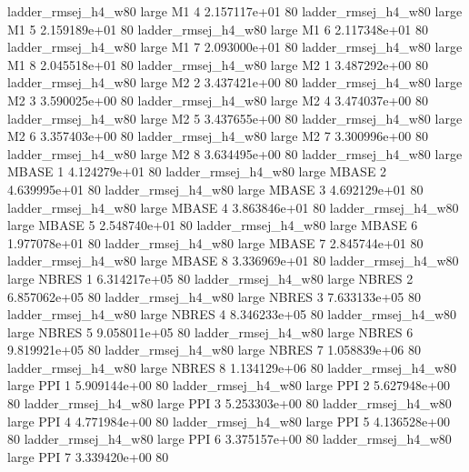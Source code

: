 ladder_rmsej_h4_w80      large       M1                 4 2.157117e+01 80
ladder_rmsej_h4_w80      large       M1                 5 2.159189e+01 80
ladder_rmsej_h4_w80      large       M1                 6 2.117348e+01 80
ladder_rmsej_h4_w80      large       M1                 7 2.093000e+01 80
ladder_rmsej_h4_w80      large       M1                 8 2.045518e+01 80
ladder_rmsej_h4_w80      large       M2                 1 3.487292e+00 80
ladder_rmsej_h4_w80      large       M2                 2 3.437421e+00 80
ladder_rmsej_h4_w80      large       M2                 3 3.590025e+00 80
ladder_rmsej_h4_w80      large       M2                 4 3.474037e+00 80
ladder_rmsej_h4_w80      large       M2                 5 3.437655e+00 80
ladder_rmsej_h4_w80      large       M2                 6 3.357403e+00 80
ladder_rmsej_h4_w80      large       M2                 7 3.300996e+00 80
ladder_rmsej_h4_w80      large       M2                 8 3.634495e+00 80
ladder_rmsej_h4_w80      large    MBASE                 1 4.124279e+01 80
ladder_rmsej_h4_w80      large    MBASE                 2 4.639995e+01 80
ladder_rmsej_h4_w80      large    MBASE                 3 4.692129e+01 80
ladder_rmsej_h4_w80      large    MBASE                 4 3.863846e+01 80
ladder_rmsej_h4_w80      large    MBASE                 5 2.548740e+01 80
ladder_rmsej_h4_w80      large    MBASE                 6 1.977078e+01 80
ladder_rmsej_h4_w80      large    MBASE                 7 2.845744e+01 80
ladder_rmsej_h4_w80      large    MBASE                 8 3.336969e+01 80
ladder_rmsej_h4_w80      large    NBRES                 1 6.314217e+05 80
ladder_rmsej_h4_w80      large    NBRES                 2 6.857062e+05 80
ladder_rmsej_h4_w80      large    NBRES                 3 7.633133e+05 80
ladder_rmsej_h4_w80      large    NBRES                 4 8.346233e+05 80
ladder_rmsej_h4_w80      large    NBRES                 5 9.058011e+05 80
ladder_rmsej_h4_w80      large    NBRES                 6 9.819921e+05 80
ladder_rmsej_h4_w80      large    NBRES                 7 1.058839e+06 80
ladder_rmsej_h4_w80      large    NBRES                 8 1.134129e+06 80
ladder_rmsej_h4_w80      large      PPI                 1 5.909144e+00 80
ladder_rmsej_h4_w80      large      PPI                 2 5.627948e+00 80
ladder_rmsej_h4_w80      large      PPI                 3 5.253303e+00 80
ladder_rmsej_h4_w80      large      PPI                 4 4.771984e+00 80
ladder_rmsej_h4_w80      large      PPI                 5 4.136528e+00 80
ladder_rmsej_h4_w80      large      PPI                 6 3.375157e+00 80
ladder_rmsej_h4_w80      large      PPI                 7 3.339420e+00 80
